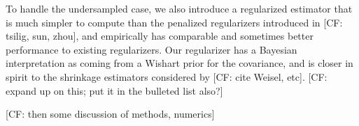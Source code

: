 \documentclass{article}
\newcommand{\R}{{\mathbb{R}}}
\newcommand{\CF}[1]{{\color{purple}[CF: #1]}}
\begin{document}
To handle the undersampled case, we also introduce a regularized estimator that is much simpler to compute than the penalized regularizers introduced in \CF{tsilig, sun, zhou}, and empirically has comparable and sometimes better performance to existing regularizers. Our regularizer has a Bayesian interpretation as coming from a Wishart prior for the covariance, and is closer in spirit to the shrinkage estimators considered by \CF{cite Weisel, etc}. \CF{expand up on this; put it in the bulleted list also?}














\CF{then some discussion of methods, numerics}
\end{document}
